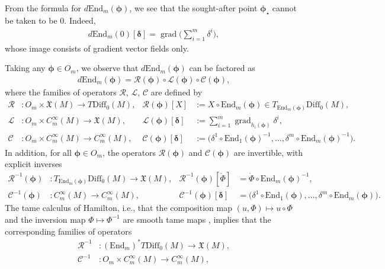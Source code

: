 \documentclass{article}
\theoremstyle{remark}
\newcommand{\M}{M}
\newcommand{\CinfV}[1]{C_{#1}^{\infty}(\M)}
\newcommand{\X}{\mathfrak{X}(\M)}
\newcommand{\Diff}{\mathrm{Diff}_0(\M)}
\DeclareMathOperator{\grad}{\mathrm{grad}}
\begin{document}
%
From the formula for $d\mathrm{End}_{m}(\bm{\phi})$, we see that the sought-after point $\bm{\phi}_\star$ cannot be taken to be $0$. Indeed,
%
\begin{align*}
    d\mathrm{End}_{m}(0)[\bm{\delta}] = \grad\Big(\sum_{i=1}^m \delta^i\Big),
\end{align*}
%
whose image consists of gradient vector fields only.
%

%
Taking any $\bm{\phi}\in O_m$, we observe that $d\mathrm{End}_{m}(\bm{\phi})$ can be factored as
%
\begin{align*}
    d\mathrm{End}_{m}(\bm{\phi}) = \mathcal{R}(\bm{\phi})\circ\mathcal{L}(\bm{\phi})\circ\mathcal{C}(\bm{\phi}), 
\end{align*}
%
where the families of operators $\mathcal{R}$, $\mathcal{L}$, $\mathcal{C}$ are defined by 
%
\begin{align*}
    \mathcal{R}&:O_m\times \X\rightarrow T\Diff, & \mathcal{R}(\bm{\phi})[X]&:= X\circ \mathrm{End}_{m}(\bm{\phi})\in T_{\mathrm{End}_{m}(\bm{\phi})}\Diff,\phantom{\sum_{i=1}^{m}}\\
    \mathcal{L}&:O_m\times\CinfV{m}\rightarrow\X, & \mathcal{L}(\bm{\phi})[\bm{\delta}]&:= \sum_{i=1}^{m} \grad_{h_i(\bm{\phi})} \delta^i, \\ \mathcal{C}&:O_m\times\CinfV{m}\rightarrow \CinfV{m}, & \mathcal{C}(\bm{\phi})[\bm{\delta}]&:= \bigl(\delta^1\circ\mathrm{End}_{1}(\bm{\phi})^{-1},\dots,\delta^m\circ\mathrm{End}_{m}(\bm{\phi})^{-1}\bigr).\phantom{\sum_{i=1}^{m}}
\end{align*}
%
In addition, for all $\bm{\phi}\in O_m$, the operators $\mathcal{R}(\bm{\phi})$ and $\mathcal{C}(\bm{\phi})$ are invertible, with explicit inverses
%
\begin{align*}
\mathcal{R}^{-1}(\bm{\phi})&:T_{\mathrm{End}_{m}(\bm{\phi})}\Diff \rightarrow \X, & \mathcal{R}^{-1}(\bm{\phi})[\dot{\Phi}]&= \dot{\Phi}\circ \mathrm{End}_{m}(\bm{\phi})^{-1}, \\
     \mathcal{C}^{-1}(\bm{\phi})&:\CinfV{m}\rightarrow\CinfV{m}, & \mathcal{C}^{-1}(\bm{\phi})[\bm{\delta}]&= \bigl(\delta^1\circ\mathrm{End}_{1}(\bm{\phi}), \dots, \delta^m\circ \mathrm{End}_{m}(\bm{\phi})\bigr).
\end{align*}
%
The tame calculus of Hamilton, i.e.,  that the composition map $(u,\Phi)\mapsto u\circ\Phi$ and the inversion map $\Phi\mapsto\Phi^{-1}$ are smooth tame maps \cite[Part~II, Theorem~2.3.5]{Hamilton1982}, implies that the corresponding families of operators
%
\begin{align*}
    \mathcal{R}^{-1}&: (\mathrm{End}_{m})^*T\Diff\rightarrow \X, \\ 
    \mathcal{C}^{-1}&:O_m\times\CinfV{m}\rightarrow\CinfV{m},
\end{align*}
\end{document}
